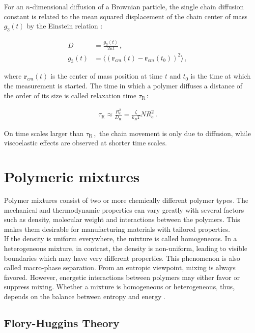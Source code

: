 \documentclass[bachelor,       %
               oneside,        %
               BCOR10mm,       %
               ngerman, english %
               ]{GAUBM}
\begin{document}
For an $n$-dimensional diffusion of a Brownian particle, the single chain diffusion constant is related to the mean squared displacement of the chain center of mass $g_3(t)$ by the Einstein relation \cite{einstein_1905}:

\begin{align}
    D&=\frac{g_3(t)}{2nt}\,, \label{eq:einstein_relation}\\
    g_3(t)&=\langle (\mathbf r_{cm}(t)-\mathbf r_{cm}(t_0))^2\rangle\,,\nonumber
\end{align}

where $\mathbf r_{cm}(t)$ is the center of mass position at time $t$ and $t_0$ is the time at which the measurement is started. The time in which a polymer diffuses a distance of the order of its size is called relaxation time $\tau_\mathrm R\,$:

\begin{align}
    \tau_\mathrm R\approx\frac{R_e^2}{D_\mathrm R}=\frac{\zeta}{k_BT}{NR_e^2}\,.
\end{align}

On time scales larger than $\tau_\mathrm R\,,$ the chain movement is only due to diffusion, while viscoelastic effects are observed at shorter time scales. 
 
 
\section{Polymeric mixtures}
Polymer mixtures consist of two or more chemically different polymer types. The mechanical and thermodynamic properties can vary greatly with several factors such as density, molecular weight and interactions between the polymers. This makes them desirable for manufacturing materials with tailored properties.\\
If the density is uniform everywhere, the mixture is called homogeneous. In a heterogeneous mixture, in contrast, the density is non-uniform, leading to visible boundaries which may have very different properties. This phenomenon is also called macro-phase separation. From an entropic viewpoint, mixing is always favored. However, energetic interactions between polymers may either favor or suppress mixing. Whether a mixture is homogeneous or heterogeneous, thus,  depends on the balance between entropy and energy \cite[S. 137]{Rubin03}.           

\subsection{Flory-Huggins Theory}
\end{document}
